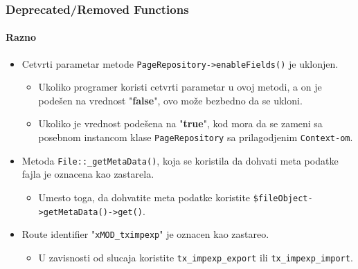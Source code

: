 \begin{frame}[fragile]
	\frametitle{Deprecated/Removed Functions}
	\framesubtitle{Razno}

	\begin{itemize}

		\item Cetvrti parametar metode \texttt{PageRepository->enableFields()} je uklonjen.

		\begin{itemize}\smaller
			\item[\ding{228}] Ukoliko programer koristi cetvrti parametar u ovoj metodi, a on je podešen na vrednost "\textbf{false}", ovo može bezbedno da se ukloni.
			\item[\ding{228}] Ukoliko je vrednost podešena na "\textbf{true}", kod mora da se zameni sa posebnom instancom klase \texttt{PageRepository} sa prilagodjenim \texttt{Context-om}.
		\end{itemize}\normalsize

		\item Metoda \texttt{File::\_getMetaData()},  koja se koristila da dohvati meta podatke fajla je oznacena kao zastarela.


			\begin{itemize}\smaller
				\item[\ding{228}] Umesto toga, da dohvatite meta podatke koristite \texttt{\$fileObject->getMetaData()->get()}.
			\end{itemize}\normalsize

		\item Route identifier "\texttt{xMOD\_tximpexp}" je oznacen kao zastareo.

			\begin{itemize}\smaller
				\item[\ding{228}] U zavisnosti od slucaja koristite \texttt{tx\_impexp\_export} ili \texttt{tx\_impexp\_import}.
			\end{itemize}\normalsize

	\end{itemize}

\end{frame}



